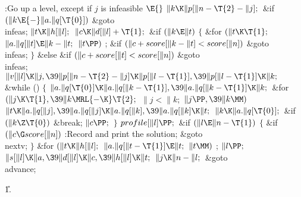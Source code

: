 \B{}:Go up a level, except  if $j$ is infeasible%
\X${}\E{}$\6
$\|k\K\|p[\|n-\T{2}-\|j];{}$\6
\&{if} ${}(\|k\E{-}\|a.\|q[\T{0}]){}$\1\5
\&{goto} \\{infeas};\2\6
${}\|t\K\|h[\|l];{}$\6
${}\|c\K\|d[\|l]+\T{1};{}$\6
\&{if} ${}(\|k\E\|t){}$\5
${}\{{}$\1\6
\&{for} ${}(\|t\K\T{1};{}$ ${}\|a.\|q[\|t]\E\|k-\|t;{}$ ${}\|t\PP){}$\1\5
;\2\6
\&{if} ${}(\|c+\\{score}[\|k-\|t]<\\{score}[\|n]){}$\1\5
\&{goto} \\{infeas};\2\6
\4${}\}{}$\5
\2\&{else} \&{if} ${}(\|c+\\{score}[\|t]<\\{score}[\|n]){}$\1\5
\&{goto} \\{infeas};\2\6
${}\|v[\|l]\K\|j,\39\|p[\|n-\T{2}-\|j]\K\|p[\|l-\T{1}],\39\|p[\|l-\T{1}]\K%
\|k;{}$\6
\&{while} ()\5
${}\{{}$\1\6
${}\|a.\|q[\T{0}]\K\|a.\|q[\|k-\T{1}],\39\|a.\|q[\|k-\T{1}]\K\|k;{}$\6
\&{for} ${}(\|j\K\T{1},\39\|k\MRL{-{\K}}\T{2};{}$ ${}\|j<\|k;{}$ ${}\|j\PP,\39%
\|k\MM){}$\1\5
${}\|t\K\|a.\|q[\|j],\39\|a.\|q[\|j]\K\|a.\|q[\|k],\39\|a.\|q[\|k]\K\|t;{}$\2\6
${}\|k\K\|a.\|q[\T{0}];{}$\6
\&{if} ${}(\|k\Z\T{0}){}$\1\5
\&{break};\2\6
${}\|c\PP;{}$\6
\4${}\}{}$\2\6
${}\\{profile}[\|l]\PP;{}$\6
\&{if} ${}(\|l\E\|n-\T{1}){}$\5
${}\{{}$\1\6
\&{if} ${}(\|c\G\\{score}[\|n]){}$\1\5
:Record and print the solution\X;\2\6
\&{goto} \\{nextv};\6
\4${}\}{}$\2\6
\&{for} ${}(\|t\K\|h[\|l];{}$ ${}\|a.\|q[\|t-\T{1}]\E\|t;{}$ ${}\|t\MM){}$\1\5
;\2\6
${}\|l\PP;{}$\6
${}\|s[\|l]\K\|a,\39\|d[\|l]\K\|c,\39\|h[\|l]\K\|t;{}$\6
${}\|j\K\|n-\|l;{}$\6
\&{goto} \\{advance};\par
\U1.\fi

